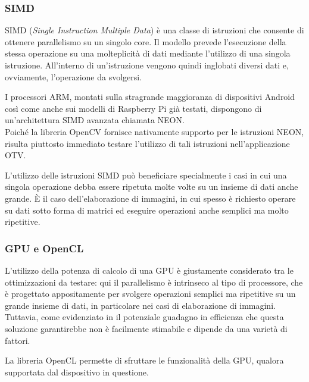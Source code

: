 \subsubsection{SIMD}

SIMD (\textit{Single Instruction Multiple Data}) è una classe di istruzioni che consente di ottenere parallelismo su un
singolo core. Il modello prevede l'esecuzione della stessa operazione su una molteplicità di dati mediante l'utilizzo di una
singola istruzione. All'interno di un'istruzione vengono quindi inglobati diversi dati e, ovviamente, l'operazione da svolgersi.

I processori ARM, montati sulla stragrande maggioranza di dispositivi Android così come anche sui modelli di Raspberry Pi già 
testati, dispongono di un'architettura SIMD avanzata chiamata NEON.\\%
Poiché la libreria OpenCV fornisce nativamente supporto per le istruzioni NEON, risulta piuttosto immediato testare l'utilizzo di
tali istruzioni nell'applicazione OTV.

L'utilizzo delle istruzioni SIMD può beneficiare specialmente i casi in cui una singola operazione debba essere ripetuta molte
volte su un insieme di dati anche grande. È il caso dell'elaborazione di immagini, in cui spesso è richiesto operare su dati sotto
forma di matrici ed eseguire operazioni anche semplici ma molto ripetitive.

\subsubsection{GPU e OpenCL}

L'utilizzo della potenza di calcolo di una GPU è giustamente considerato tra le ottimizzazioni da testare: qui il parallelismo
è intrinseco al tipo di processore, che è progettato appositamente per svolgere operazioni semplici ma ripetitive su un grande
insieme di dati, in particolare nei casi di elaborazione di immagini. Tuttavia, come evidenziato in \cite{rs12122047}
il potenziale guadagno in efficienza che questa soluzione garantirebbe non è facilmente stimabile e dipende da una varietà di
fattori.

La libreria OpenCL permette di sfruttare le funzionalità della GPU, qualora supportata dal dispositivo in questione.
